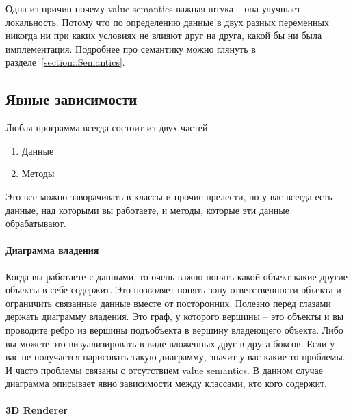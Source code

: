 Одна из причин почему value semantics важная штука -- она улучшает локальность.
Потому что по определению данные в двух разных переменных никогда ни при каких условиях не влияют друг на друга, какой бы ни была имплементация.
Подробнее про семантику можно глянуть в разделе~\ref{section::Semantics}.

\subsection{Явные зависимости}
\label{section::Explicitness}

Любая программа всегда состоит из двух частей
\begin{enumerate}
\item Данные

\item Методы
\end{enumerate}
Это все можно заворачивать в классы и прочие прелести, но у вас всегда есть данные, над которыми вы работаете, и методы, которые эти данные обрабатывают.

\paragraph{Диаграмма владения}

Когда вы работаете с данными, то очень важно понять какой объект какие другие объекты в себе содержит.
Это позволяет понять зону ответственности объекта и ограничить связанные данные вместе от посторонних.
Полезно перед глазами держать диаграмму владения.
Это граф, у которого вершины -- это объекты и вы проводите ребро из вершины подъобъекта в вершину владеющего объекта.
Либо вы можете это визуализировать в виде вложенных друг в друга боксов.
Если у вас не получается нарисовать такую диаграмму, значит у вас какие-то проблемы.
И часто проблемы связаны с отсутствием value semantics.
В данном случае диаграмма описывает явно зависимости между классами, кто кого содержит.

\paragraph{3D Renderer}

